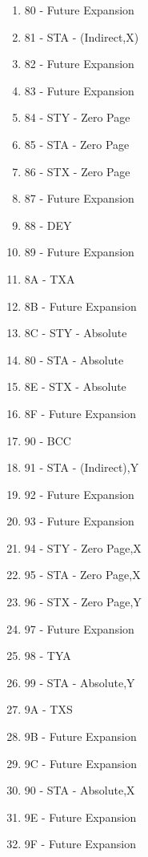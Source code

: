 \documentclass{article}
\begin{document}
\begin{multicols}{2}
\begin{enumerate}[label=\enumHex*,start=0]
    \item 80 - Future Expansion           
    \item 81 - STA - (Indirect,X)         
    \item 82 - Future Expansion           
    \item 83 - Future Expansion           
    \item 84 - STY - Zero Page            
    \item 85 - STA - Zero Page            
    \item 86 - STX - Zero Page            
    \item 87 - Future Expansion           
    \item 88 - DEY                        
    \item 89 - Future Expansion           
    \item 8A - TXA                        
    \item 8B - Future Expansion           
    \item 8C - STY - Absolute             
    \item 80 - STA - Absolute             
    \item 8E - STX - Absolute             
    \item 8F - Future Expansion           
    \item 90 - BCC                        
    \item 91 - STA - (Indirect),Y         
    \item 92 - Future Expansion           
    \item 93 - Future Expansion           
    \item 94 - STY - Zero Page,X          
    \item 95 - STA - Zero Page,X          
    \item 96 - STX - Zero Page,Y          
    \item 97 - Future Expansion           
    \item 98 - TYA                        
    \item 99 - STA - Absolute,Y           
    \item 9A - TXS                        
    \item 9B - Future Expansion           
    \item 9C - Future Expansion           
    \item 90 - STA - Absolute,X           
    \item 9E - Future Expansion           
    \item 9F - Future Expansion           

\end{enumerate}
\end{multicols}
\end{document}
